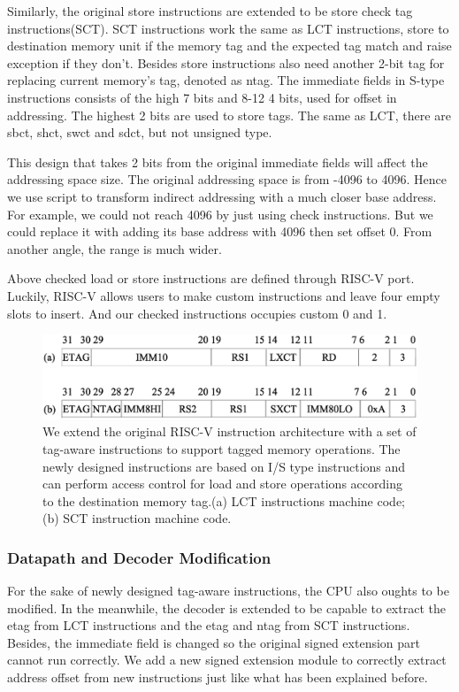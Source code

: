 \documentclass[conference]{IEEEtran}
\begin{document}
Similarly, the original store instructions are extended to be store check tag instructions(SCT). SCT instructions work the same as LCT instructions, store to destination memory unit if the memory tag and the expected tag match and raise exception if they don't. Besides store instructions also need another 2-bit tag for replacing current memory's tag, denoted as ntag. The immediate fields in S-type instructions consists of the high 7 bits and 8-12 4 bits, used for offset in addressing. The highest 2 bits are used to store tags. The same as LCT, there are sbct, shct, swct and sdct, but not unsigned type.

This design that takes 2 bits from the original immediate fields will affect the addressing space size. The original addressing space is from -4096 to 4096. Hence we use script to transform indirect addressing with a much closer base address. For example, we could not reach 4096 by just using check instructions. But we could replace it with adding its base address with 4096 then set offset 0. From another angle, the range is much wider.

Above checked load or store instructions are defined through RISC-V port. Luckily, RISC-V allows users to make custom instructions and leave four empty slots to insert. And our checked instructions occupies custom 0 and 1.

\begin{figure}
	\includegraphics[width=\columnwidth]{asset/LSCT.eps}
	\caption{We extend the original RISC-V instruction architecture with a set of tag-aware instructions to support tagged memory operations. The newly designed instructions are based on I/S type instructions and can perform access control for load and store operations according to the destination memory tag.(a) LCT instructions machine code; (b) SCT instruction machine code.}
	\label{fig:LSCT}
\end{figure}

\subsubsection{Datapath and Decoder Modification}
For the sake of newly designed tag-aware instructions, the CPU also oughts to be modified. In the meanwhile, the decoder is extended to be capable to extract the etag from LCT instructions and the etag and ntag from SCT instructions. Besides, the immediate field is changed so the original signed extension part cannot run correctly. We add a new signed extension module to correctly extract address offset from new instructions just like what has been explained before.
\end{document}
